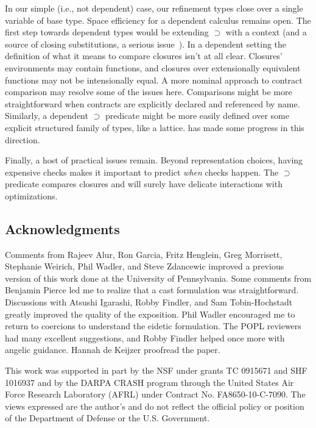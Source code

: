 \documentclass[9pt]{extarticle}
\begin{document}
In our simple (i.e., not dependent) case, our refinement types close
over a single variable of base type.
Space efficiency for a dependent calculus remains open.
The first step towards dependent types would be extending $ \supset $
with a context (and a source of closing substitutions, a serious
issue~\cite{Belo11fh}).
In a dependent setting the definition of what it means to compare
closures isn't at all clear. Closures' environments may contain
functions, and closures over extensionally equivalent functions may
not be intensionally equal.
A more nominal approach to contract comparison may resolve some of the
issues here. Comparisons might be more straightforward when contracts
are explicitly declared and referenced by name. Similarly, a dependent
$ \supset $ predicate might be more easily defined over some explicit
structured family of types, like a lattice. 
has made some progress in this direction.

Finally, a host of practical issues remain. Beyond representation
choices, having expensive checks makes it important to predict
\textit{when} checks happen. The $ \supset $ predicate compares closures
and will surely have delicate interactions with optimizations.


{\iffull
\subsection*{Acknowledgments}
\else
\acks
\fi}
Comments from Rajeev Alur, Ron Garcia, Fritz Henglein, Greg Morrisett,
Stephanie Weirich, Phil Wadler, and Steve Zdancewic improved a
previous version of this work done at the University of
Pennsylvania. Some comments from Benjamin Pierce led me to realize
that a cast formulation was straightforward.
Discussions with Atsushi Igarashi, Robby Findler, and Sam
Tobin-Hochstadt greatly improved the quality of the exposition. Phil
Wadler encouraged me to return to coercions to understand the eidetic
formulation. The POPL reviewers had many excellent suggestions, and
Robby Findler helped once more with angelic guidance. Hannah de
Keijzer proofread the paper.

This work was supported in part by the NSF under grants TC 0915671 and
SHF 1016937 and by the DARPA CRASH program through the United States
Air Force Research Laboratory (AFRL) under Contract
No. FA8650-10-C-7090.  The views expressed are the author's and do not
reflect the official policy or position of the Department of Defense
or the U.S. Government.
\end{document}

